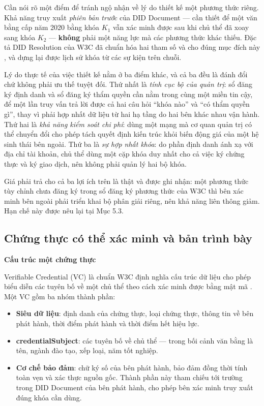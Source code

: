 Cần nói rõ một điểm để tránh ngộ nhận về lý do thiết kế một phương thức riêng. Khả năng truy xuất \emph{phiên bản trước} của DID Document --- cần thiết để một văn bằng cấp năm 2020 bằng khóa $K_1$ vẫn xác minh được sau khi chủ thể đã xoay sang khóa $K_2$ --- \textbf{không} phải một năng lực mà các phương thức khác thiếu. Đặc tả DID Resolution của W3C đã chuẩn hóa hai tham số  và  cho đúng mục đích này \cite{W3C_DIDResolution}, và  dựng lại được lịch sử khóa từ các sự kiện trên chuỗi.

Lý do thực tế của việc thiết kế  nằm ở ba điểm khác, và cả ba đều là đánh đổi chứ không phải ưu thế tuyệt đối. Thứ nhất là \emph{tính cục bộ của quản trị}: sổ đăng ký định danh và sổ đăng ký thẩm quyền cần nằm trong cùng một miền tin cậy, để một lần truy vấn trả lời được cả hai câu hỏi {``}khóa nào{''} và {``}có thẩm quyền gì{''}, thay vì phải hợp nhất dữ liệu từ hai hạ tầng do hai bên khác nhau vận hành. Thứ hai là \emph{khả năng kiểm soát chi phí}: dùng một mạng mà cơ quan quản trị có thể chuyển đổi cho phép tách quyết định kiến trúc khỏi biến động giá của một hệ sinh thái bên ngoài. Thứ ba là \emph{sự hợp nhất khóa}: do phần định danh ánh xạ với địa chỉ tài khoản, chủ thể dùng một cặp khóa duy nhất cho cả việc ký chứng thực và ký giao dịch, nên không phải quản lý hai bộ khóa.

Giá phải trả cho cả ba lợi ích trên là thật và được ghi nhận: một phương thức tùy chỉnh chưa đăng ký trong sổ đăng ký phương thức của W3C thì bên xác minh bên ngoài phải triển khai bộ phân giải riêng, nên khả năng liên thông giảm. Hạn chế này được nêu lại tại Mục 5.3.

\subsection{Chứng thực có thể xác minh và bản trình bày}

\noindent \textbf{Cấu trúc một chứng thực}

Verifiable Credential (VC) là chuẩn W3C định nghĩa cấu trúc dữ liệu cho phép biểu diễn các tuyên bố về một chủ thể theo cách xác minh được bằng mật mã \cite{W3C_VCDM2025}. Một VC gồm ba nhóm thành phần:

\begin{itemize}
    \item \textbf{Siêu dữ liệu}: định danh của chứng thực, loại chứng thực, thông tin về bên phát hành, thời điểm phát hành và thời điểm hết hiệu lực.
    \item \textbf{credentialSubject}: các tuyên bố về chủ thể --- trong bối cảnh văn bằng là tên, ngành đào tạo, xếp loại, năm tốt nghiệp.
    \item \textbf{Cơ chế bảo đảm}: chữ ký số của bên phát hành, bảo đảm đồng thời tính toàn vẹn và xác thực nguồn gốc. Thành phần này tham chiếu tới trường  trong DID Document của bên phát hành, cho phép bên xác minh truy xuất đúng khóa cần dùng.
\end{itemize}

